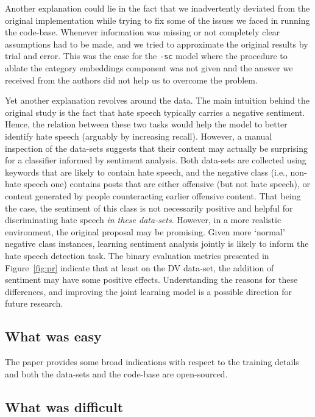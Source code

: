 Another explanation could lie in the fact that we inadvertently deviated from the original implementation while trying to fix some of the issues we faced in running the code-base. Whenever information was missing or not completely clear assumptions had to be made, and we tried to approximate the original results by trial and error. This was the case for the \texttt{-sc} model where the procedure to ablate the category embeddings component was not given and the answer we received from the authors did not help us to overcome the problem.

Yet another explanation revolves around the data. The main intuition behind the original study is the fact that hate speech typically carries a negative sentiment. Hence, the relation between these two tasks would help the model to better identify hate speech (arguably by increasing recall). However, a manual inspection of the data-sets suggests that their content may actually be surprising for a classifier informed by sentiment analysis.
Both data-sets are collected using keywords that are likely to contain hate speech, and the negative class (i.e., non-hate speech one) contains posts that are either offensive (but not hate speech), or content generated by people counteracting earlier offensive content.
That being the case, the sentiment of this class is not necessarily positive and helpful for discriminating hate speech \emph{in these data-sets}. However, in a more realistic environment, the original proposal may be promising. Given more `normal' negative class instances, learning sentiment analysis jointly is likely to inform the hate speech detection task.
The binary evaluation metrics presented in Figure~\ref{fig:pr} indicate that at least on the DV data-set, the addition of sentiment may have some positive effects. Understanding the reasons for these differences, and improving the joint learning model is a possible direction for future research.

\subsection{What was easy}

The paper provides some broad indications with respect to the training details and both the data-sets and the code-base are open-sourced.


\subsection{What was difficult}

